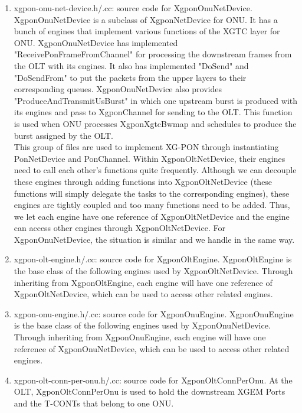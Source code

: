 \begin{enumerate}
 \item xgpon-onu-net-device.h/.cc: source code for {\color{red} XgponOnuNetDevice}. XgponOnuNetDevice is a subclass 
of XgponNetDevice for ONU. It has a bunch of engines that implement various functions of the XGTC layer for ONU. 
XgponOnuNetDevice has implemented "ReceivePonFrameFromChannel" for processing the downstream frames from the OLT with its engines. 
It also has implemented "DoSend" and "DoSendFrom" to put the packets from the upper layers to their corresponding queues. 
XgponOnuNetDevice also provides "ProduceAndTransmitUsBurst" in which one upstream burst is produced with its engines 
and pass to XgponChannel for sending to the OLT. This function is used when ONU processes XgponXgtcBwmap and schedules 
to produce the burst assigned by the OLT.
\\
{\color{blue} This group of files are used to implement XG-PON through instantiating PonNetDevice and PonChannel. 
Within XgponOltNetDevice, their engines need to call each other's functions quite frequently. Although we can 
decouple these engines through adding functions into XgponOltNetDevice (these functions will simply delegate 
the tasks to the corresponding engines), these engines are tightly coupled and too many functions need to be added. 
Thus, we let each engine have one reference of XgponOltNetDevice and the engine can access other engines through 
XgponOltNetDevice. For XgponOnuNetDevice, the situation is similar and we handle in the same way.}
\vspace{0.3in}




 \item xgpon-olt-engine.h/.cc: source code for {\color{red} XgponOltEngine}. XgponOltEngine is the base class of the following engines 
used by XgponOltNetDevice. Through inheriting from XgponOltEngine, each engine will have one reference of XgponOltNetDevice, 
which can be used to access other related engines.

 \item xgpon-onu-engine.h/.cc: source code for {\color{red} XgponOnuEngine}. XgponOnuEngine is the base class of 
the following engines used by XgponOnuNetDevice. Through inheriting from XgponOnuEngine, each engine will have 
one reference of XgponOnuNetDevice, which can be used to access other related engines.
\vspace{0.2in}


 \item xgpon-olt-conn-per-onu.h/.cc: source code for {\color{red} XgponOltConnPerOnu}. At the OLT, 
XgponOltConnPerOnu is used to hold the downstream XGEM Ports and the T-CONTs that belong to one ONU.


\end{enumerate}
